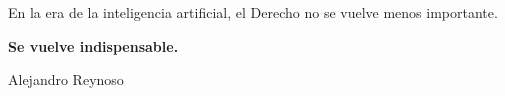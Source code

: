 \documentclass[aspectratio=169,10pt]{beamer}
\begin{document}
{\begin{frame}[plain]
\begin{minipage}{10.35cm}
{En la era de la inteligencia artificial, el Derecho no se vuelve menos importante.}

\end{minipage}\par

\vfill

{\color{white}\fontsize{18}{21}\selectfont\bfseries Se vuelve indispensable.}\par

\vspace{0.34cm}

{\color{white!65}\tiny Alejandro Reynoso}

\vspace{0.38cm}

\end{frame}

}
\end{document}
